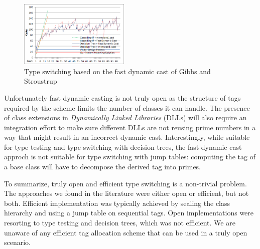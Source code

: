 \begin{figure}[htbp]
  \centering
    \includegraphics[width=0.47\textwidth]{DCast-vs-Visitors2.png}
  \caption{Type switching based on the fast dynamic cast of Gibbs and Stroustrup~\cite{FastDynCast}}
  \label{fig:DCastVis2}
\end{figure}


Unfortunately fast dynamic casting is not truly open as the structure of tags 
required by the scheme limits the number of classes it can handle. 
The presence of class extensions in \emph{Dynamically Linked Libraries} (DLLs) 
will also require an integration effort to make sure different DLLs are not 
reusing prime numbers in a way that might result in an incorrect dynamic cast.
Interestingly, while suitable for type testing and type switching with decision 
trees, the fast dynamic cast approch is not suitable for type switching with 
jump tables: computing the tag of a base class will have to decompose the 
derived tag into primes.

To summarize, truly open and efficient type switching is a non-trivial problem. 
The approaches we found in the literature were either open or efficient, 
but not both. Efficient implementation was typically achieved by sealing the 
class hierarchy and using a jump table on sequential tags. Open implementations 
were resorting to type testing and decision trees, which was not efficient. 
We are unaware of any efficient tag allocation scheme that can be used in a 
truly open scenario.
